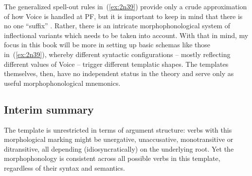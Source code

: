 \begin{exe}
\begin{xlist}
\begin{exe}
\begin{xlist}
\begin{exe}
\begin{xlist}
\begin{exe}
\begin{exe}
\begin{xlist}
\begin{exe}
\begin{xlist}
\begin{exe}
\begin{xlist}
\begin{exe}
\begin{xlist}
\begin{exe}
\begin{xlist}
\begin{exe}
\begin{xlist}
\begin{exe}
\begin{xlist}
\begin{exe}
\begin{xlist}
\begin{exe}
\begin{xlist}
\begin{exe}
\begin{xlist}
\begin{exe}
\begin{xlist}
\begin{exe}
\begin{xlist}
\begin{exe}
\begin{xlist}
\begin{exe}
\begin{exe}
\begin{xlist}
\begin{exe}
\begin{xlist}
\begin{exe}
\begin{xlist}
\begin{exe}
\begin{xlist}
\begin{exe}
\begin{xlist}
\begin{exe}
\begin{xlist}
\begin{exe}
\begin{xlist}
\begin{exe}
\begin{xlist}
\begin{xlist}
\begin{xlist}
\begin{exe}
\begin{xlist}
\begin{xlist}
\begin{xlist}
\begin{exe}
\begin{exe}
\begin{xlist}
The generalized spell-out rules in~(\ref{ex:2n39}) provide only a crude approximation of how Voice is handled at PF, but it is important to keep in mind that there is no one ``suffix'' {\tkal}. Rather, there is an intricate morphophonological system of inflectional variants which needs to be taken into account. With that in mind, my focus in this book will be more in setting up basic schemas like those in~(\ref{ex:2n39}), whereby different syntactic configurations -- mostly reflecting different values of Voice -- trigger different templatic shapes. The templates themselves, then, have no independent status in the theory and serve only as useful morphophonological mnemonics.

	\subsection{Interim summary} \label{voice:voice:sum}
The template {\tkal} is unrestricted in terms of argument structure: verbs with this morphological marking might be unergative, unaccusative, monotransitive or ditransitive, all depending (idiosyncratically) on the underlying root. Yet the morphophonology is consistent across all possible verbs in this template, regardless of their syntax and semantics.


\end{xlist}
\end{exe}
\end{exe}
\end{xlist}
\end{xlist}
\end{xlist}
\end{exe}
\end{xlist}
\end{xlist}
\end{xlist}
\end{exe}
\end{xlist}
\end{exe}
\end{xlist}
\end{exe}
\end{xlist}
\end{exe}
\end{xlist}
\end{exe}
\end{xlist}
\end{exe}
\end{xlist}
\end{exe}
\end{xlist}
\end{exe}
\end{exe}
\end{xlist}
\end{exe}
\end{xlist}
\end{exe}
\end{xlist}
\end{exe}
\end{xlist}
\end{exe}
\end{xlist}
\end{exe}
\end{xlist}
\end{exe}
\end{xlist}
\end{exe}
\end{xlist}
\end{exe}
\end{xlist}
\end{exe}
\end{xlist}
\end{exe}
\end{xlist}
\end{exe}
\end{xlist}
\end{exe}
\end{xlist}
\end{exe}
\end{exe}
\end{xlist}
\end{exe}
\end{xlist}
\end{exe}
\end{xlist}
\end{exe}
